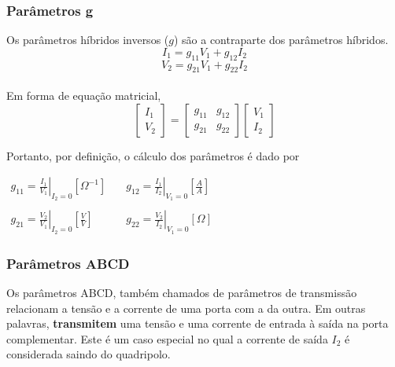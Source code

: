 \documentclass{article}
\numberwithin{equation}{section}
\begin{document}
    \subsubsection{Parâmetros g}
    Os parâmetros híbridos inversos ($g$) são a contraparte dos parâmetros híbridos.
    \begin{equation*}
        I_{1}=g_{11}V_{1}+g_{12}I_{2}
    \end{equation*}
    \begin{equation*}
        V_{2}=g_{21}V_{1}+g_{22}I_{2}
    \end{equation*}\\
    Em forma de equação matricial,
    \begin{equation}
        \begin{bmatrix}
            I_{1} \\
            V_{2}
        \end{bmatrix}
        = %
        \begin{bmatrix}
            g_{11} & g_{12} \\
            g_{21} & g_{22}
        \end{bmatrix}
        \begin{bmatrix}
            V_{1} \\
            I_{2}
        \end{bmatrix}
    \end{equation}

    Portanto, por definição, o cálculo dos parâmetros é dado por
    \begin{center}
        $\begin{matrix} %
                g_{11}=\displaystyle\left.\frac{I_{1}}{V_{1}}\right|_{I_{2}=0} [\Omega^{-1}] &\quad g_{12}=\displaystyle\left.\frac{I_{1}}{I_{2}}\right|_{V_{1}=0}\left[\frac{A}{A}\right]\\\\
                g_{21}=\displaystyle\left.\frac{V_{2}}{V_{1}}\right|_{I_{2}=0}\left[\frac{V}{V}\right]&\quad
                g_{22}=\displaystyle\left.\frac{V_{2}}{I_{2}}\right|_{V_{1}=0} [\Omega]
        \end{matrix}$
    \end{center}


    \subsubsection{Parâmetros ABCD}
    \label{subsubsec:quadripolostransm}
    Os parâmetros ABCD, também chamados de parâmetros de transmissão relacionam a tensão e a corrente de uma porta com a da outra. Em outras palavras, \textbf{transmitem} uma tensão e uma corrente de entrada à saída na porta complementar. Este é um caso especial no qual a corrente de saída $I_{2}$ é considerada saindo do quadripolo.
\end{document}
